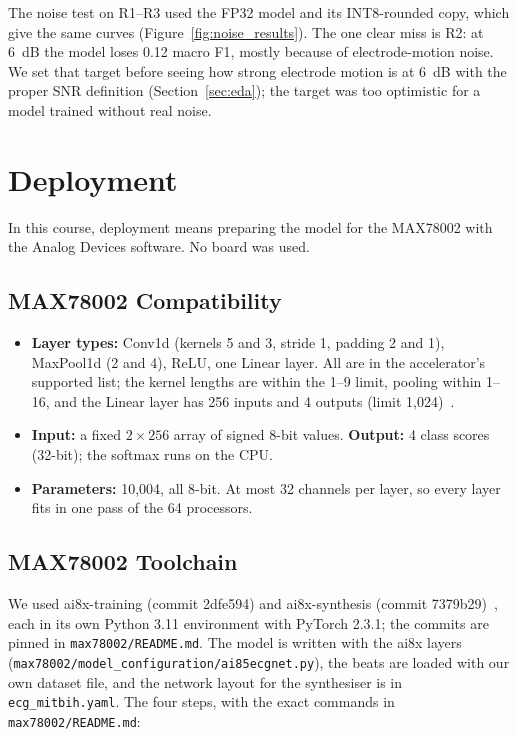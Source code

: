 \documentclass[11pt,a4paper]{article}
\newcommand{\code}[1]{\texttt{#1}}
\begin{document}
The noise test on R1--R3 used the FP32 model and its INT8-rounded copy, which give the same curves (Figure~\ref{fig:noise_results}). The one clear miss is R2: at 6~dB the model loses 0.12 macro F1, mostly because of electrode-motion noise. We set that target before seeing how strong electrode motion is at 6~dB with the proper SNR definition (Section~\ref{sec:eda}); the target was too optimistic for a model trained without real noise.

\section{Deployment}
\label{sec:toolchain}

In this course, deployment means preparing the model for the MAX78002 with the Analog Devices software. No board was used.

\subsection{MAX78002 Compatibility}

\begin{itemize}
  \item \textbf{Layer types:} Conv1d (kernels 5 and 3, stride 1, padding 2 and 1), MaxPool1d (2 and 4), ReLU, one Linear layer. All are in the accelerator's supported list; the kernel lengths are within the 1--9 limit, pooling within 1--16, and the Linear layer has 256 inputs and 4 outputs (limit 1,024)~\citep{adi_ai8x_training}.
  \item \textbf{Input:} a fixed $2 \times 256$ array of signed 8-bit values. \textbf{Output:} 4 class scores (32-bit); the softmax runs on the CPU.
  \item \textbf{Parameters:} 10,004, all 8-bit. At most 32 channels per layer, so every layer fits in one pass of the 64 processors.
\end{itemize}

\subsection{MAX78002 Toolchain}

We used ai8x-training (commit 2dfe594) and ai8x-synthesis (commit 7379b29)~\citep{adi_ai8x_training,adi_ai8x_synthesis}, each in its own Python 3.11 environment with PyTorch 2.3.1; the commits are pinned in \code{max78002/README.md}. The model is written with the ai8x layers (\code{max78002/model\_configuration/ai85ecgnet.py}), the beats are loaded with our own dataset file, and the network layout for the synthesiser is in \code{ecg\_mitbih.yaml}. The four steps, with the exact commands in \code{max78002/README.md}:
\end{document}
